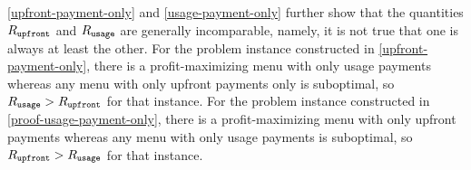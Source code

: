 
\cref{upfront-payment-only} and \cref{usage-payment-only} further show that the quantities $R_\mathtt{upfront}$ and $R_\mathtt{usage}$ are generally incomparable, namely, it is not true that one is always at least the other. For the problem instance constructed in \cref{upfront-payment-only}, there is a profit-maximizing menu with only usage payments whereas any menu with only upfront payments only is suboptimal, so $R_\mathtt{usage} > R_\mathtt{upfront}$ for that instance. For the problem instance constructed in \cref{proof-usage-payment-only}, there is a profit-maximizing menu with only upfront payments whereas any menu with only usage payments is suboptimal, so $R_\mathtt{upfront} > R_\mathtt{usage}$ for that instance.





